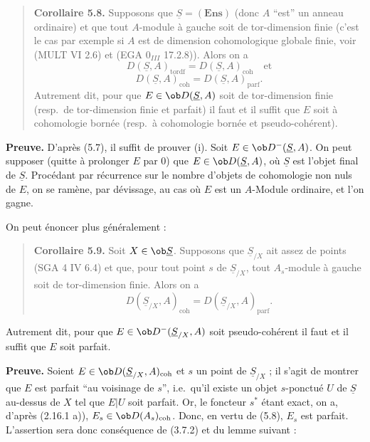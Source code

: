 \begin{quote}
\textbf{Corollaire 5.8.} Supposons que $\underline{S} = (\mathbf{Ens})$ (donc $A$ ``est'' un anneau ordinaire) et que tout $A$-module à gauche soit de tor-dimension finie (c'est le cas par exemple si $A$ est de dimension cohomologique globale finie, voir (MULT VI 2.6) et (EGA $0_{III}$ 17.2.8)). Alors on a
\[
D(\underline{S}, A)_{\mathrm{tordf}} = D(\underline{S}, A)_{\mathrm{coh}} \quad \text{et}
\]
\[
D(\underline{S}, A)_{\mathrm{coh}} = D(\underline{S}, A)_{\mathrm{parf}}.
\]
Autrement dit, pour que $E \in \ob D(\underline{S}, A)$ soit de tor-dimension finie (resp.\ de tor-dimension finie et parfait) il faut et il suffit que $E$ soit à cohomologie bornée (resp.\ à cohomologie bornée et pseudo-cohérent).
\end{quote}

\textbf{Preuve.} D'après (5.7), il suffit de prouver (i). Soit $E \in \ob D^-(\underline{S}, A)$. On peut supposer (quitte à prolonger $E$ par $0$) que $E \in \ob D(\underline{S}, A)$, où $\underline{S}$ est l'objet final de $\underline{S}$. Procédant par récurrence sur le nombre d'objets de cohomologie non nuls de $E$, on se ramène, par dévissage, au cas où $E$ est un $A$-Module ordinaire, et l'on gagne.

On peut énoncer plus généralement :

\begin{quote}
\textbf{Corollaire 5.9.} Soit $X \in \ob \underline{S}$. Supposons que $\underline{S}_{/X}$ ait assez de points (SGA 4 IV 6.4) et que, pour tout point $s$ de $\underline{S}_{/X}$, tout $A_s$-module à gauche soit de tor-dimension finie. Alors on a
\[
D(\underline{S}_{/X}, A)_{\mathrm{coh}} = D(\underline{S}_{/X}, A)_{\mathrm{parf}}.
\]
\end{quote}

Autrement dit, pour que $E \in \ob D^-(\underline{S}_{/X}, A)$ soit pseudo-cohérent il faut et il suffit que $E$ soit parfait.

\textbf{Preuve.} Soient $E \in \ob D(\underline{S}_{/X}, A)_{\mathrm{coh}}$ et $s$ un point de $\underline{S}_{/X}$ ; il s'agit de montrer que $E$ est parfait ``au voisinage de $s$'', i.e.\ qu'il existe un objet $s$-ponctué $U$ de $\underline{S}$ au-dessus de $X$ tel que $E|U$ soit parfait. Or, le foncteur $s^*$ étant exact, on a, d'après (2.16.1 a)), $E_s \in \ob D(A_s)_{\mathrm{coh}}$. Donc, en vertu de (5.8), $E_s$ est parfait. L'assertion sera donc conséquence de (3.7.2) et du lemme suivant :

